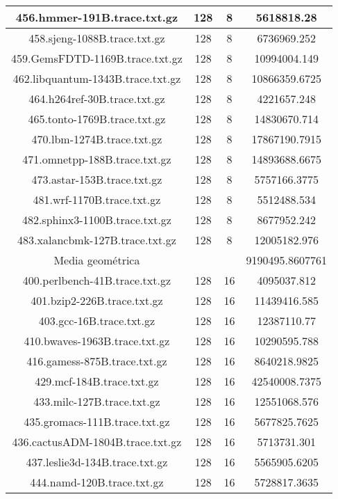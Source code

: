 \begin{table}[H]
\begin{center}
{\begin{tabular}{|c|c|c|c|}
		\hline
		456.hmmer-191B.trace.txt.gz	&	128	&	8	&	5618818.28	\\
		\hline
		458.sjeng-1088B.trace.txt.gz	&	128	&	8	&	6736969.252	\\
		\hline
		459.GemsFDTD-1169B.trace.txt.gz	&	128	&	8	&	10994004.149	\\
		\hline
		462.libquantum-1343B.trace.txt.gz	&	128	&	8	&	10866359.6725	\\
		\hline
		464.h264ref-30B.trace.txt.gz	&	128	&	8	&	4221657.248	\\
		\hline
		465.tonto-1769B.trace.txt.gz	&	128	&	8	&	14830670.714	\\
		\hline
		470.lbm-1274B.trace.txt.gz	&	128	&	8	&	17867190.7915	\\
		\hline
		471.omnetpp-188B.trace.txt.gz	&	128	&	8	&	14893688.6675	\\
		\hline
		473.astar-153B.trace.txt.gz	&	128	&	8	&	5757166.3775	\\
		\hline
		481.wrf-1170B.trace.txt.gz	&	128	&	8	&	5512488.534	\\
		\hline
		482.sphinx3-1100B.trace.txt.gz	&	128	&	8	&	8677952.242	\\
		\hline
		483.xalancbmk-127B.trace.txt.gz	&	128	&	8	&	12005182.976	\\
		\hline
		\hline
		Media	geométrica	&		&	&	9190495.8607761	\\
		\hline
		400.perlbench-41B.trace.txt.gz	&	128	&	16	&	4095037.812	\\
		\hline
		401.bzip2-226B.trace.txt.gz	&	128	&	16	&	11439416.585	\\
		\hline
		403.gcc-16B.trace.txt.gz	&	128	&	16	&	12387110.77	\\
		\hline
		410.bwaves-1963B.trace.txt.gz	&	128	&	16	&	10290595.788	\\
		\hline
		416.gamess-875B.trace.txt.gz	&	128	&	16	&	8640218.9825	\\
		\hline
		429.mcf-184B.trace.txt.gz	&	128	&	16	&	42540008.7375	\\
		\hline
		433.milc-127B.trace.txt.gz	&	128	&	16	&	12551068.576	\\
		\hline
		435.gromacs-111B.trace.txt.gz	&	128	&	16	&	5677825.7625	\\
		\hline
		436.cactusADM-1804B.trace.txt.gz	&	128	&	16	&	5713731.301	\\
		\hline
		437.leslie3d-134B.trace.txt.gz	&	128	&	16	&	5565905.6205	\\
		\hline
		444.namd-120B.trace.txt.gz	&	128	&	16	&	5728817.3635	\\
		\hline

\end{tabular}}
\end{center}
\end{table}
